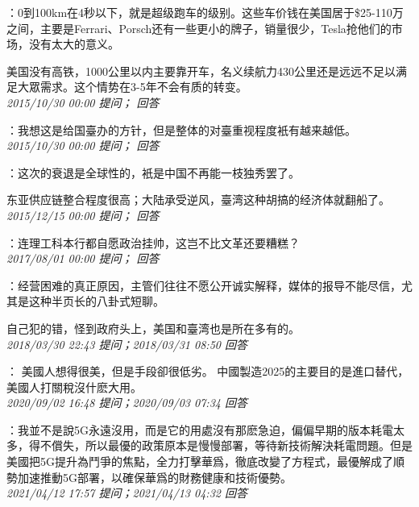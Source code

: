\documentclass[twocolumn]{ctexart}
\begin{document}
：0到100km在4秒以下，就是超级跑车的级别。这些车价钱在美国居于\$25-110万之间，主要是Ferrari、Porsch还有一些更小的牌子，销量很少，Tesla抢他们的市场，没有太大的意义。

美国没有高铁，1000公里以内主要靠开车，名义续航力430公里还是远远不足以满足大眾需求。这个情势在3-5年不会有质的转变。\\

\textit{\hfill\noindent\small 2015/10/30 00:00 提问； 回答}

：我想这是给国臺办的方针，但是整体的对臺重视程度衹有越来越低。\\

\textit{\hfill\noindent\small 2015/10/30 00:00 提问； 回答}

：这次的衰退是全球性的，衹是中国不再能一枝独秀罢了。

东亚供应链整合程度很高；大陆承受逆风，臺湾这种胡搞的经济体就翻船了。\\

\textit{\hfill\noindent\small 2015/12/15 00:00 提问； 回答}

：连理工科本行都自愿政治挂帅，这岂不比文革还要糟糕？\\

\textit{\hfill\noindent\small 2017/08/01 00:00 提问； 回答}

：经营困难的真正原因，主管们往往不愿公开诚实解释，媒体的报导不能尽信，尤其是这种半页长的八卦式短聊。

自己犯的错，怪到政府头上，美国和臺湾也是所在多有的。\\

\textit{\hfill\noindent\small 2018/03/30 22:43 提问；2018/03/31 08:50 回答}

：
美國人想得很美，但是手段卻很低劣。
中國製造2025的主要目的是進口替代，美國人打關稅沒什麽大用。
\\

\textit{\hfill\noindent\small 2020/09/02 16:48 提问；2020/09/03 07:34 回答}

：我並不是說5G永遠沒用，而是它的用處沒有那麽急迫，偏偏早期的版本耗電太多，得不償失，所以最優的政策原本是慢慢部署，等待新技術解決耗電問題。但是美國把5G提升為鬥爭的焦點，全力打擊華爲，徹底改變了方程式，最優解成了順勢加速推動5G部署，以確保華爲的財務健康和技術優勢。
\\

\textit{\hfill\noindent\small 2021/04/12 17:57 提问；2021/04/13 04:32 回答}
\end{document}
